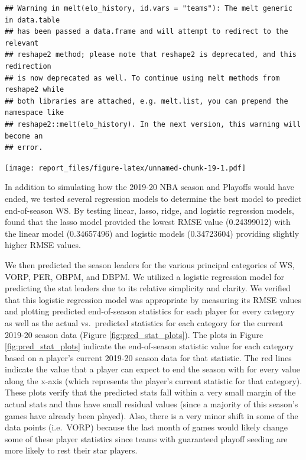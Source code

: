 \documentclass[]{article}
\begin{document}
\begin{verbatim}
## Warning in melt(elo_history, id.vars = "teams"): The melt generic in data.table
## has been passed a data.frame and will attempt to redirect to the relevant
## reshape2 method; please note that reshape2 is deprecated, and this redirection
## is now deprecated as well. To continue using melt methods from reshape2 while
## both libraries are attached, e.g. melt.list, you can prepend the namespace like
## reshape2::melt(elo_history). In the next version, this warning will become an
## error.
\end{verbatim}

\texttt{[image: report\_files/figure-latex/unnamed-chunk-19-1.pdf]}

In addition to simulating how the 2019-20 NBA season and Playoffs would
have ended, we tested several regression models to determine the best
model to predict end-of-season WS. By testing linear, lasso, ridge, and
logistic regression models, found that the lasso model provided the
lowest RMSE value (0.24399012) with the linear model (0.34657496) and
logistic models (0.34723604) providing slightly higher RMSE values.

We then predicted the season leaders for the various principal
categories of WS, VORP, PER, OBPM, and DBPM. We utilized a logistic
regression model for predicting the stat leaders due to its relative
simplicity and clarity. We verified that this logistic regression model
was appropriate by measuring its RMSE values and plotting predicted
end-of-season statistics for each player for every category as well as
the actual vs.~predicted statistics for each category for the current
2019-20 season data (Figure \ref{fig:pred_stat_plots}). The plots in
Figure \ref{fig:pred_stat_plots} indicate the end-of-season statistic
value for each category based on a player's current 2019-20 season data
for that statistic. The red lines indicate the value that a player can
expect to end the season with for every value along the x-axis (which
represents the player's current statistic for that category). These
plots verify that the predicted stats fall within a very small margin of
the actual stats and thus have small residual values (since a majority
of this season's games have already been played). Also, there is a very
minor shift in some of the data points (i.e.~VORP) because the last
month of games would likely change some of these player statistics since
teams with guaranteed playoff seeding are more likely to rest their star
players.
\end{document}
